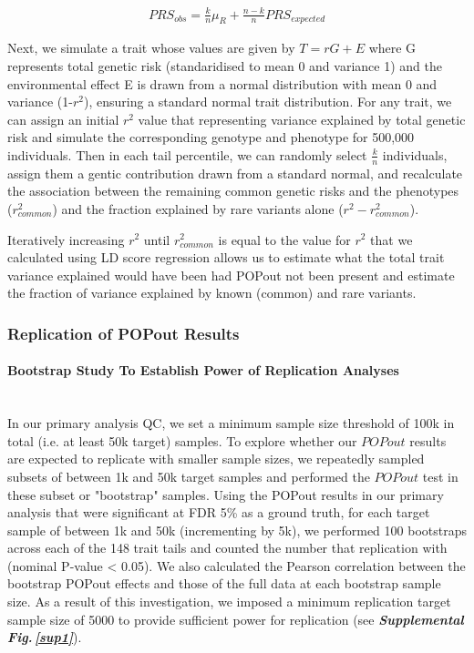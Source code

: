 \documentclass[12pt]{zHenriquesLab-StyleBioRxiv}
\newcommand\sref[1]{\normalsize{\textbf{\textit{Supplemental Fig.\,\ref{#1}}}}\normalsize{}}
\begin{document}
\begin{align*}
    PRS_{obs} = \frac{k}{n} \mu_R    + \frac{n-k}{n} PRS_{expected} 
\end{align*}

Next, we simulate a trait whose values are given by $T=rG + E$ where G represents total genetic risk 
(standaridised to mean 0 and variance 1) and the environmental effect E is drawn from a 
normal distribution with mean 0 and variance (1-$r^2$), ensuring a standard normal trait distribution. 
For any trait, we can assign an initial $r^2$ value that representing variance explained by total 
genetic risk and simulate the corresponding genotype and phenotype for 500,000 individuals. Then in each 
tail percentile, we can randomly select $\frac{k}{n}$ individuals, assign them a gentic contribution drawn 
from a standard normal, and recalculate the association between the remaining common genetic risks and the 
phenotypes ($r^2_{common}$) and the fraction explained by rare variants alone ($r^2 - r^2_{common}$).  
 
Iteratively increasing $r^2$ until $r^2_{common}$ is equal to the value for $r^2$ that we calculated 
using LD score regression \cite{ldsc} allows us to estimate what the total trait variance explained would 
have been had POPout not been present and estimate the fraction of variance explained by known (common) and 
rare variants. 






\subsubsection*{Replication of POPout Results}
\paragraph{Bootstrap Study To Establish Power of Replication Analyses} ~\\
In our primary analysis QC, we set a minimum sample size threshold of 100k in total 
(i.e. at least 50k target) samples. To explore whether our $POPout$ results are expected 
to replicate with smaller sample sizes, we repeatedly sampled subsets of between 1k and 50k 
target samples and performed the $POPout$ test in these subset or "bootstrap" samples. 
Using the POPout results in our primary analysis that were significant at FDR 5\% as a ground 
truth, for each target sample of between 1k and 50k (incrementing by 5k), 
we performed 100 bootstraps across each of the 148 trait tails and counted 
the number that replication with (nominal P-value < 0.05). 
We also calculated the Pearson correlation between the bootstrap 
POPout effects and those of the full data at each bootstrap sample size. As a result of 
this investigation, we imposed a minimum replication target sample size of 5000 to 
provide sufficient power for replication (see \sref{sup1}). 
\end{document}
